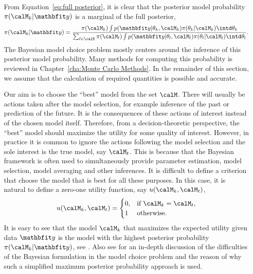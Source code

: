 From Equation~\eqref{eq:full posterior}, it is clear that the posterior model
probability $\pi(\calM_k|\data)$ is a marginal of the full posterior,
\begin{equation}
  \pi(\calM_k|\data) =
  \frac{
    \pi(\calM_k)
    \int p(\data|\theta_k,\calM_k)\pi(\theta_k|\calM_k)\intd\theta_k
  }{
    \sum_{l\in\calK}\pi(\calM_l)
    \int p(\data|\theta_l,\calM_l)\pi(\theta_l|\calM_l)\intd\theta_l
  }.
  \label{eq:post model prob}
\end{equation}
The Bayesian model choice problem mostly centers around the inference of this
posterior model probability. Many methods for computing this probability is
reviewed in Chapter~\ref{cha:Monte Carlo Methods}. In the remainder of this
section, we assume that the calculation of required quantities is possible and
accurate.

Our aim is to choose the ``best'' model from the set $\calM$. There will
usually be actions taken after the model selection, for example inference of
the past or prediction of the future. It is the consequences of these actions
of interest instead of the chosen model itself. Therefore, from a
decision-theoretic perspective, the ``best'' model should maximize the utility
for some quality of interest. However, in practice it is common to ignore the
actions following the model selection and the sole interest is the true model,
say $\calM_t$. This is because that the Bayesian framework is often used to
simultaneously provide parameter estimation, model selection, model averaging
and other inferences. It is difficult to define a criterion that choose the
model that is best for all these purposes. In this case, it is natural to
define a zero-one utility function, say $u(\calM_k,\calM_t)$,
\begin{equation}
  u(\calM_k,\calM_t) =
  \begin{cases}
    0, &\text{if } \calM_k = \calM_t,\\
    1  &\text{otherwise.}
  \end{cases}
\end{equation}
It is easy to see that the model $\calM_k$ that maximizes the expected utility
given data $\data$ is the model with the highest posterior probability
$\pi(\calM_k|\data)$, see \cite[][chap.~6]{Bernardo:1994vd}. Also see
\cite[][sec.~7.2.1]{Robert:2007tc} for an in-depth discussion of the
difficulties of the Bayesian formulation in the model choice problem and the
reason of why such a simplified maximum posterior probability approach is
used.

